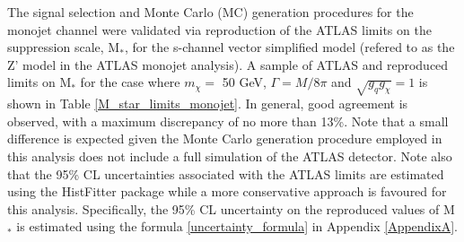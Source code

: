 \begin{flushleft}
The signal selection and Monte Carlo (MC) generation procedures for the monojet channel were validated via reproduction of the ATLAS limits on the suppression scale, M$_{*}$, for the s-channel vector simplified model (refered to as the Z' model in the ATLAS monojet analysis). A sample of ATLAS and reproduced limits on M$_{*}$ for the case where $m_{\chi} = $ 50 GeV, $\Gamma = M/8\pi$ and $\sqrt{g_{q}g_{\chi}} = 1$ is shown in Table \ref{M_star_limits_monojet}. In general, good agreement is observed, with a maximum discrepancy of no more than 13\%. Note that a small difference is expected given the Monte Carlo generation procedure employed in this analysis does not include a full simulation of the ATLAS detector.  Note also that the 95\% CL uncertainties associated with the ATLAS limits are estimated using the HistFitter package while a more conservative approach is favoured for this analysis. Specifically, the 95\% CL uncertainty on the reproduced values of M$_{*}$ is estimated using the formula \ref{uncertainty_formula} in Appendix \ref{AppendixA}. 


\bigskip


\end{flushleft}
